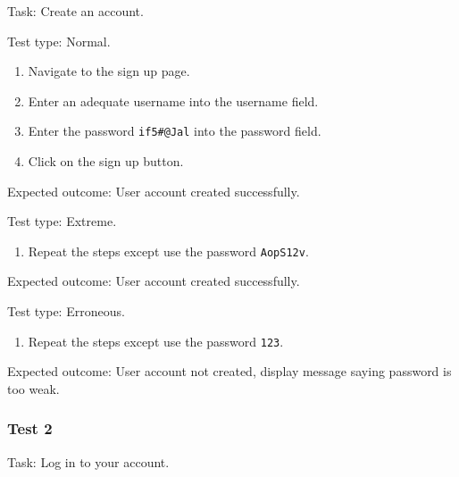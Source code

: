 {\sffamily Task:} Create an account.\\ 

{\color{gray} \hrulefill}

{\sffamily Test type: Normal.}

\begin{enumerate}
  \item Navigate to the sign up page.
  \item Enter an adequate username into the username field.
  \item Enter the password \texttt{if5\#@Jal} into the password field.
  \item Click on the sign up button.
\end{enumerate}

{\sffamily Expected outcome:} User account created successfully. \\ 

{\color{gray} \hrulefill}

{\sffamily Test type: Extreme.}\\ 

\begin{enumerate}
\item Repeat the steps except use the password \texttt{AopS12v}.\\ 
\end{enumerate}

{\sffamily Expected outcome:} User account created successfully.\\ 

{\color{gray} \hrulefill}

{\sffamily Test type: Erroneous.} \\ 

\begin{enumerate}
\item Repeat the steps except use the password \texttt{123}.  
\end{enumerate}

{\sffamily Expected outcome:} User account not created, display 
message saying password is too weak.\\

{\color{gray} \hrulefill}

\subsubsection{Test 2}

{\sffamily Task:} Log in to your account.\\ 


